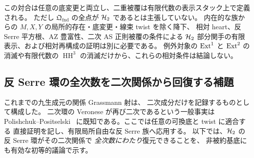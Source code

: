 \begin{remark}[この相対構成の射程]
この対合は任意の底変更と両立し、二重被覆は有限代数の表示スタック上で定義される。
ただし $\mathfrak Q_{\mathrm{fnd}}$ の全点が $\mathcal H_2$ であるとは主張していない。
内在的な族からの $M,X,Y$ の局所的存在・底変更・線束 twist を除く降下、
相対 heart、反 Serre 平方根、AZ 豊富性、二次 AS 正則被覆の条件による
$\mathcal H_2$ 部分関手の有限表示、および相対再構成の証明は別に必要である。
例外対象の $\operatorname{Ext}^1$ と $\operatorname{Ext}^2$ の消滅や有限代数の
$\operatorname{HH}^3$ の消滅だけから、これらの相対条件は結論しない。
\end{remark}

\subsection{反 Serre 環の全次数を二次関係から回復する補題}
\label{subsec:relative-quadratic-veronese}

これまでの九生成元の関係 Grassmann 射は、
二次成分だけを記録するものとして構成した。
二次環の Veronese が再び二次であるという一般事実は
Polishchuk--Positselski~\cite[Chapter 3, Proposition 2.2]{PolishchukPositselski2005}
に既知である。ここでは任意の可換底と twist に適合する
直接証明を記し、有限局所自由な反 Serre 族へ応用する。
以下では、$\mathcal H_2$ の反 Serre 環がその二次関係で
\emph{全次数にわたり}復元できることを、
非被約基底にも有効な初等的議論で示す。

